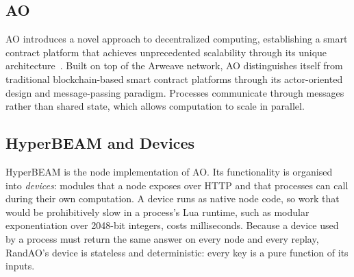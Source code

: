 \subsection{AO}\label{sec:ao}
AO introduces a novel approach to decentralized computing, establishing a smart contract platform that achieves unprecedented scalability through its unique architecture~\cite{williams2024ao}. Built on top of the Arweave network, AO distinguishes itself from traditional blockchain-based smart contract platforms through its actor-oriented design and message-passing paradigm. Processes communicate through messages rather than shared state, which allows computation to scale in parallel.

\subsection{HyperBEAM and Devices}\label{sec:hyperbeam}
HyperBEAM is the node implementation of AO. Its functionality is organised into \emph{devices}: modules that a node exposes over HTTP and that processes can call during their own computation. A device runs as native node code, so work that would be prohibitively slow in a process's Lua runtime, such as modular exponentiation over 2048-bit integers, costs milliseconds. Because a device used by a process must return the same answer on every node and every replay, RandAO's device is stateless and deterministic: every key is a pure function of its inputs.
